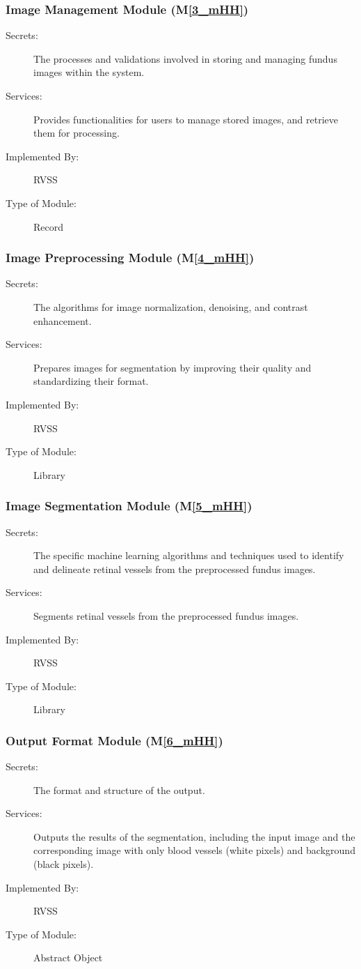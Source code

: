 \documentclass[12pt, titlepage]{article}
\newcommand{\mref}[1]{M\ref{#1}}
\begin{document}
\subsubsection{Image Management Module (\mref{3_mHH})}
\begin{description}
\item[Secrets:] The processes and validations involved in storing and managing fundus images within the system.
\item[Services:] Provides functionalities for users to manage stored images, and retrieve them for processing.
\item[Implemented By:] RVSS
\item[Type of Module:] Record
\end{description}



\subsubsection{Image Preprocessing Module (\mref{4_mHH})}
\begin{description}
\item[Secrets:] The algorithms for image normalization, denoising, and contrast enhancement.
\item[Services:] Prepares images for segmentation by improving their quality and standardizing their format.
\item[Implemented By:] RVSS
\item[Type of Module:] Library
\end{description}

\subsubsection{Image Segmentation Module (\mref{5_mHH})}

\begin{description}
\item[Secrets:] The specific machine learning algorithms and techniques used to identify and delineate retinal vessels from the preprocessed fundus images.
\item[Services:] Segments retinal vessels from the preprocessed fundus images.
\item[Implemented By:] RVSS
\item[Type of Module:] Library
\end{description}

\subsubsection{Output Format Module (\mref{6_mHH})}
\begin{description}
\item[Secrets:] The format and structure of the output.
\item[Services:] Outputs the results of the segmentation, including the input image and the corresponding image with only blood vessels (white pixels) and background (black pixels). 
\item[Implemented By:] RVSS
\item[Type of Module:] Abstract Object
\end{description}
\end{document}
